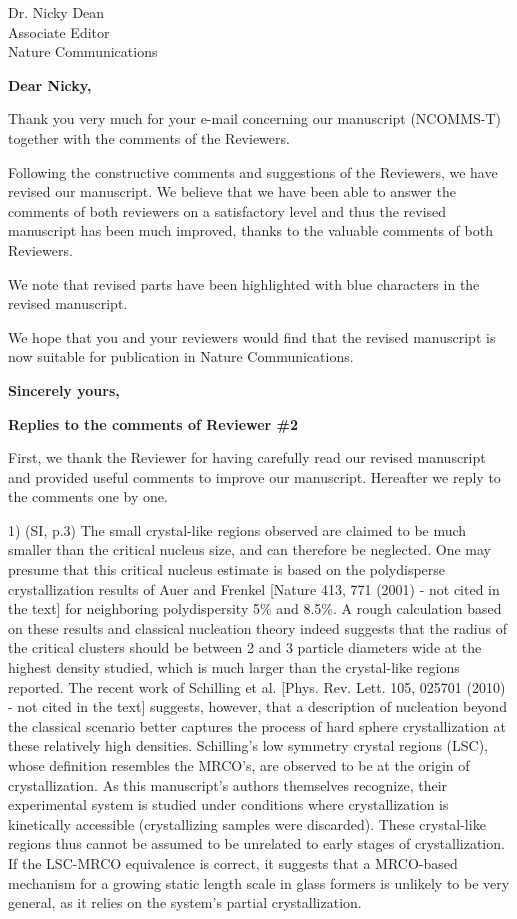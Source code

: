\documentclass[a4paper, rebuttal, parskip=true, firsthead=false, fromemail=true, foldmarks=false]{scrlttr2}
\begin{document}
 
\begin{letter}{Dr. Nicky Dean\\
Associate Editor\\
Nature Communications}
\opening{\bf Dear Nicky,}

Thank you very much for your e-mail concerning our manuscript (NCOMMS\nobreakdash-T) together with the comments of the Reviewers. 

Following the constructive comments and suggestions of the Reviewers, we have revised our manuscript. 
We believe that we have been able to answer the comments of both reviewers on a satisfactory level and thus the revised manuscript has been much improved, thanks to the valuable comments of both Reviewers. 

We note that revised parts have been highlighted with blue characters in the revised manuscript. 

We hope that you and your reviewers would find that the revised manuscript is now suitable for publication in Nature Communications. 

\closing{\bf Sincerely yours,} 
\clearpage

\textsf{\textbf{Replies to the comments of Reviewer \#2}}

First, we thank the Reviewer for having carefully read our revised manuscript and provided useful comments to improve our manuscript. 
Hereafter we reply to the comments one by one. 

\begin{quotationi}
1) (SI, p.3) The small crystal-like regions observed are claimed to be much smaller than the critical nucleus size, and can therefore be neglected. One may presume that this critical nucleus estimate is based on the polydisperse crystallization results of Auer and Frenkel [Nature 413, 771 (2001) - not cited in the text] for neighboring polydispersity 5\% and 8.5\%. A rough calculation based on these results and classical nucleation theory indeed suggests that the radius of the critical clusters should be between 2 and 3 particle diameters wide at the highest density studied, which is much larger than the crystal-like regions reported. The recent work of Schilling et al. [Phys. Rev. Lett. 105, 025701 (2010) - not cited in the text] suggests, however, that a description of nucleation beyond the classical scenario better captures the process of hard sphere crystallization at these relatively high densities. Schilling's low symmetry crystal regions (LSC), whose definition resembles the MRCO's, are observed to be at the origin of crystallization. As this manuscript's authors themselves recognize, their experimental system is studied under conditions where crystallization is kinetically accessible (crystallizing samples were discarded). These crystal-like regions thus cannot be assumed to be unrelated to early stages of crystallization. If the LSC-MRCO equivalence is correct, it suggests that a MRCO-based mechanism for a growing static length scale in glass formers is unlikely to be very general, as it relies on the system's partial crystallization.
\end{quotationi}


\end{letter}
\end{document}
